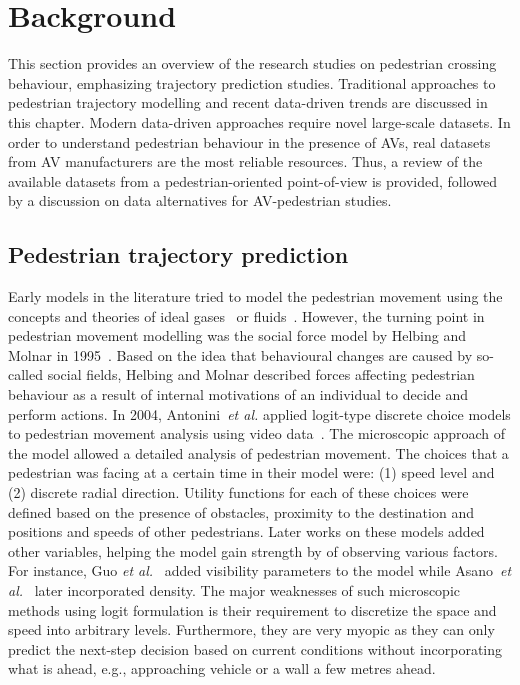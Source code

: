 \section{Background}
\label{S:tBack}
This section provides an overview of the research studies on pedestrian crossing behaviour, emphasizing trajectory prediction studies. Traditional approaches to pedestrian trajectory modelling and recent data-driven trends are discussed in this chapter. Modern data-driven approaches require novel large-scale datasets. In order to understand pedestrian behaviour in the presence of AVs, real datasets from AV manufacturers are the most reliable resources. Thus, a review of the available datasets from a pedestrian-oriented point-of-view is provided, followed by a discussion on data alternatives for AV-pedestrian studies.      
\subsection{Pedestrian trajectory prediction}
Early models in the literature tried to model the pedestrian movement using the concepts and theories of ideal gases~\cite{henderson1974fluid} or fluids~\cite{helbing1998fluid}. However, the turning point in pedestrian movement modelling was the social force model by Helbing and Molnar in 1995~\cite{helbing1995social}. Based on the idea that behavioural changes are caused by so-called social fields, Helbing and Molnar described forces affecting pedestrian behaviour as a result of internal motivations of an individual to decide and perform actions. In 2004, Antonini~\textit{et al.} applied logit-type discrete choice models to pedestrian movement analysis using video data~\cite{antonini2004simulation}. The microscopic approach of the model allowed a detailed analysis of pedestrian movement. The choices that a pedestrian was facing at a certain time in their model were: (1) speed level and (2) discrete radial direction. Utility functions for each of these choices were defined based on the presence of obstacles, proximity to the destination and positions and speeds of other pedestrians. Later works on these models added other variables, helping the model gain strength by of observing various factors. For instance, Guo \textit{et al.}~\cite{guo2012route} added visibility parameters to the model while Asano~\textit{et al.}~\cite{asano2010microscopic} later incorporated density. The major weaknesses of such microscopic methods using logit formulation is their requirement to discretize the space and speed into arbitrary levels. Furthermore, they are very myopic as they can only predict the next-step decision based on current conditions without incorporating what is ahead, e.g., approaching vehicle or a wall a few metres ahead.

